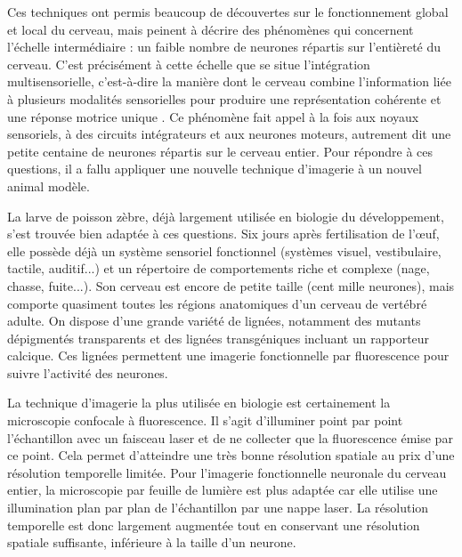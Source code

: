 Ces techniques ont permis beaucoup de découvertes sur le fonctionnement global et local du cerveau, mais peinent à décrire des phénomènes qui concernent l'échelle intermédiaire : un faible nombre de neurones répartis sur l'entièreté du cerveau. C'est précisément à cette échelle que se situe l'intégration multisensorielle, c'est-à-dire la manière dont le cerveau combine l'information liée à plusieurs modalités sensorielles pour produire une représentation cohérente et une réponse motrice unique \cite{stein_multisensory_2008}. Ce phénomène fait appel à la fois aux noyaux sensoriels, à des circuits intégrateurs et aux neurones moteurs, autrement dit une petite centaine de neurones répartis sur le cerveau entier. Pour répondre à ces questions, il a fallu appliquer une nouvelle technique d'imagerie à un nouvel animal modèle.

La larve de poisson zèbre, déjà largement utilisée en biologie du développement, s'est trouvée bien adaptée à ces questions. Six jours après fertilisation de l’œuf, elle possède déjà un système sensoriel fonctionnel (systèmes visuel, vestibulaire, tactile, auditif...) et un répertoire de comportements riche et complexe (nage, chasse, fuite...). Son cerveau est encore de petite taille (cent mille neurones), mais comporte quasiment toutes les régions anatomiques d'un cerveau de vertébré adulte. On dispose d'une grande variété de lignées, notamment des mutants dépigmentés transparents et des lignées transgéniques incluant un rapporteur calcique. Ces lignées permettent une imagerie fonctionnelle par fluorescence pour suivre l'activité des neurones.

La technique d'imagerie la plus utilisée en biologie est certainement la microscopie confocale à fluorescence. Il s'agit d'illuminer point par point l'échantillon avec un faisceau laser et de ne collecter que la fluorescence émise par ce point. Cela permet d'atteindre une très bonne résolution spatiale au prix d'une résolution temporelle limitée. Pour l'imagerie fonctionnelle neuronale du cerveau entier, la microscopie par feuille de lumière est plus adaptée car elle utilise une illumination plan par plan de l'échantillon par une nappe laser. La résolution temporelle est donc largement augmentée tout en conservant une résolution spatiale suffisante, inférieure à la taille d'un neurone. 

